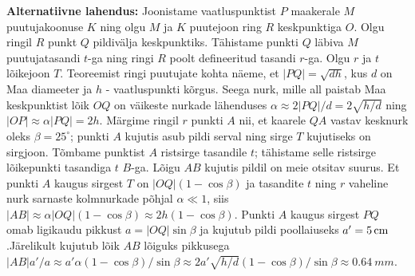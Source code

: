 {\bf Alternatiivne lahendus:} Joonistame vaatluspunktist $P$ maakerale $M$ puutujakoonuse $K$ ning olgu $M$ ja $K$ puutejoon ring $R$ keskpunktiga $O$. Olgu ringil $R$ punkt $Q$ pildivälja keskpunktiks. Tähistame punkti $Q$ läbiva $M$ puutujatasandi $t$-ga ning ringi $R$ poolt defineeritud tasandi $r$-ga. Olgu $r$ ja $t$ lõikejoon $T$. Teoreemist ringi puutujate kohta näeme, et $|PQ|=\sqrt{dh}$, kus $d$ on Maa diameeter ja $h$ - vaatluspunkti kõrgus. Seega nurk, mille all paistab Maa keskpunktist lõik $OQ$ on väikeste nurkade lähenduses $\alpha \approx 2|PQ|/d=2\sqrt{h/d}$ ning $|OP|\approx \alpha |PQ|=2h$. Märgime ringil $r$ punkti $A$ nii, et kaarele $QA$ vastav kesknurk oleks $\beta=25^\circ$; punkti $A$ kujutis asub pildi serval ning sirge $T$ kujutiseks on sirgjoon. Tõmbame punktist $A$ ristsirge tasandile $t$; tähistame selle ristsirge lõikepunkti tasandiga $t$ $B$-ga. Lõigu $AB$ kujutis pildil on meie otsitav suurus. Et punkti $A$ kaugus sirgest $T$ on $|OQ|(1-\cos\beta)$ ja tasandite $t$ ning $r$ vaheline nurk sarnaste kolmnurkade põhjal $\alpha \ll 1$, siis $|AB|\approx \alpha |OQ|(1-\cos\beta)\approx 2h(1-\cos\beta)$. Punkti $A$ kaugus sirgest $PQ$ omab ligikaudu pikkust $a=|OQ|\sin\beta$ ja kujutub pildi poollaiuseks $a'=\SI 5{cm}$.Järelikult kujutub lõik $AB$ lõiguks pikkusega $|AB|a'/a\approx a'\alpha(1-\cos\beta)/\sin\beta\approx 2a'\sqrt{h/d}(1-\cos\beta)/\sin\beta\approx \SI{0.64}{mm}$.
\probend